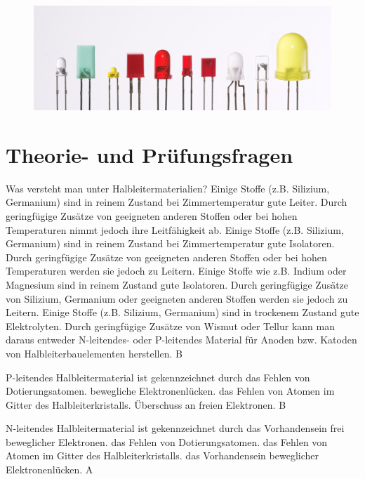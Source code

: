 \begin{figure}
 \vspace{-6cm}
 \includegraphics[scale=0.25]{Diode/Bilder/Verschiedene_LEDs.jpg}
 \vspace{-6cm}
\end{figure}

\section*{Theorie- und Prüfungsfragen} 


{Was versteht man unter Halbleitermaterialien?}%
{Einige Stoffe (z.B. Silizium, Germanium) sind in reinem Zustand bei Zimmertemperatur gute Leiter. Durch geringfügige Zusätze von geeigneten anderen Stoffen oder bei hohen Temperaturen nimmt jedoch ihre Leitfähigkeit ab.}%
{Einige Stoffe (z.B. Silizium, Germanium) sind in reinem Zustand bei Zimmertemperatur gute Isolatoren. Durch geringfügige Zusätze von geeigneten anderen Stoffen oder bei hohen Temperaturen werden sie jedoch zu Leitern.}%
{Einige Stoffe wie z.B. Indium oder Magnesium sind in reinem Zustand gute Isolatoren. Durch geringfügige Zusätze von Silizium, Germanium oder geeigneten anderen Stoffen werden sie jedoch zu Leitern.}%
{Einige Stoffe (z.B. Silizium, Germanium) sind in trockenem Zustand gute Elektrolyten. Durch geringfügige Zusätze von Wismut oder Tellur kann man daraus entweder N-leitendes- oder P-leitendes Material für Anoden bzw. Katoden von Halbleiterbauelementen herstellen.}%
{B}%

{P-leitendes Halbleitermaterial ist gekennzeichnet durch}%
{das Fehlen von Dotierungsatomen.}%
{bewegliche Elektronenlücken.}%
{das Fehlen von Atomen im Gitter des Halbleiterkristalls.}%
{Überschuss an freien Elektronen.}%
{B}%

{N-leitendes Halbleitermaterial ist gekennzeichnet durch}%
{das Vorhandensein frei beweglicher Elektronen.}%
{das Fehlen von Dotierungsatomen.}%
{das Fehlen von Atomen im Gitter des Halbleiterkristalls.}%
{das Vorhandensein beweglicher Elektronenlücken.}%
{A}%


